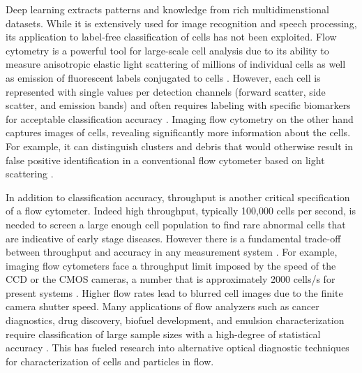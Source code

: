 \documentclass[aps,pra,reprint,superscriptaddress]{revtex4-1}
\begin{document}

Deep learning extracts patterns and knowledge from rich multidimenstional datasets. While it is extensively used for image recognition and speech processing, its application to label-free classification of cells has not been exploited. Flow cytometry is a powerful tool for large-scale cell analysis due to its ability to measure anisotropic elastic light scattering of millions of individual cells as well as emission of fluorescent labels conjugated to cells \cite{shapiro2005practical,watson2004introduction}. However, each cell is represented with single values per detection channels (forward scatter, side scatter, and emission bands) and often requires labeling with specific biomarkers for acceptable classification accuracy \cite{shapiro2005practical,perfetto2004seventeen}. Imaging flow cytometry \cite{basiji2007cellular,basiji2001imaging} on the other hand captures images of cells, revealing significantly more information about the cells. For example, it can distinguish clusters and debris that would otherwise result in false positive identification in a conventional flow cytometer based on light scattering \cite{carpenter2006cellprofiler}.

In addition to classification accuracy, throughput is another critical specification of a flow cytometer. Indeed high throughput, typically 100,000 cells per second, is needed to screen a large enough cell population to find rare abnormal cells that are indicative of early stage diseases. However there is a fundamental trade-off between throughput and accuracy in any measurement system \cite{razavi1995principles,mahjoubfar2013optically}. For example, imaging flow cytometers face a throughput limit imposed by the speed of the CCD or the CMOS cameras, a number that is approximately 2000 cells/s for present systems \cite{goda2012high}. Higher flow rates lead to blurred cell images due to the finite camera shutter speed. Many applications of flow analyzers such as cancer diagnostics, drug discovery, biofuel development, and emulsion characterization require classification of large sample sizes with a high-degree of statistical accuracy \cite{zanella2010high}. This has fueled research into alternative optical diagnostic techniques for characterization of cells and particles in flow.
\end{document}
